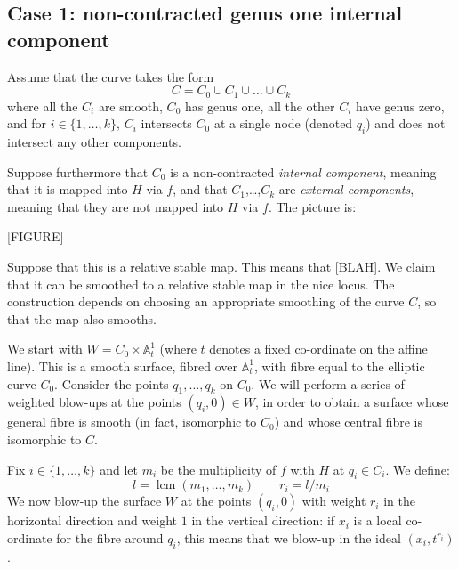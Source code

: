 \documentclass[11pt]{amsart}
\newcommand{\Aaff}{\mathbb{A}}
\theoremstyle{definition}
\theoremstyle{definition}
\begin{document}
\subsection*{Case 1: non-contracted genus one internal component} Assume that the curve takes the form
\begin{equation*} C = C_0 \cup C_1 \cup \ldots \cup C_k \end{equation*}
where all the $C_i$ are smooth, $C_0$ has genus one, all the other $C_i$ have genus zero, and for $i \in \{1,\ldots,k\}$, $C_i$ intersects $C_0$ at a single node (denoted $q_i$) and does not intersect any other components.

Suppose furthermore that $C_0$ is a non-contracted \emph{internal component}, meaning that it is mapped into $H$ via $f$, and that $C_1$,\ldots,$C_k$ are \emph{external components}, meaning that they are not mapped into $H$ via $f$. The picture is:

[FIGURE]

Suppose that this is a relative stable map. This means that [BLAH]. We claim that it can be smoothed to a relative stable map in the nice locus. The construction depends on choosing an appropriate smoothing of the curve $C$, so that the map also smooths.

We start with $W = C_0 \times \Aaff^1_t$ (where $t$ denotes a fixed co-ordinate on the affine line). This is a smooth surface, fibred over $\Aaff^1_t$, with fibre equal to the elliptic curve $C_0$. Consider the points $q_1, \ldots, q_k$ on $C_0$. We will perform a series of weighted blow-ups at the points $(q_i,0) \in W$, in order to obtain a surface whose general fibre is smooth (in fact, isomorphic to $C_0$) and whose central fibre is isomorphic to $C$.

Fix $i \in \{1,\ldots,k\}$ and let $m_i$ be the multiplicity of $f$ with $H$ at $q_i \in C_i$. We define:
\begin{equation*} l = \operatorname{lcm}(m_1,\ldots,m_k) \qquad r_i = l/m_i \end{equation*}
We now blow-up the surface $W$ at the points $(q_i,0)$ with weight $r_i$ in the horizontal direction and weight $1$ in the vertical direction: if $x_i$ is a local co-ordinate for the fibre around $q_i$, this means that we blow-up in the ideal $(x_i,t^{r_i})$.
\end{document}
